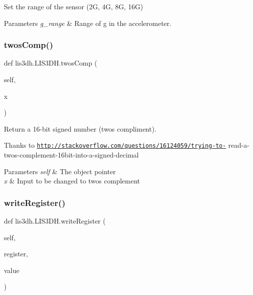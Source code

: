 Set the range of the sensor (2G, 4G, 8G, 16G) 


\begin{DoxyParams}{Parameters}
{\em g\+\_\+range} & Range of g in the accelerometer. \\
\hline
\end{DoxyParams}
\mbox{\label{classlis3dh_1_1_l_i_s3_d_h_a50ef59d0e77fae235ed31f2f6e6ae57c}} 
\subsubsection{\texorpdfstring{twos\+Comp()}{twosComp()}}
{\footnotesize\ttfamily def lis3dh.\+L\+I\+S3\+D\+H.\+twos\+Comp (\begin{DoxyParamCaption}\item[{}]{self,  }\item[{}]{x }\end{DoxyParamCaption})}



Return a 16-\/bit signed number (two\textquotesingle{}s compliment). 

Thanks to \href{http://stackoverflow.com/questions/16124059/trying-to-}{\tt http\+://stackoverflow.\+com/questions/16124059/trying-\/to-\/} read-\/a-\/twos-\/complement-\/16bit-\/into-\/a-\/signed-\/decimal 
\begin{DoxyParams}{Parameters}
{\em self} & The object pointer \\
\hline
{\em x} & Input to be changed to two\textquotesingle{}s complement \\
\hline
\end{DoxyParams}
\mbox{\label{classlis3dh_1_1_l_i_s3_d_h_ad240efbeee72b620399ba8ae8016bcd5}} 
\subsubsection{\texorpdfstring{write\+Register()}{writeRegister()}}
{\footnotesize\ttfamily def lis3dh.\+L\+I\+S3\+D\+H.\+write\+Register (\begin{DoxyParamCaption}\item[{}]{self,  }\item[{}]{register,  }\item[{}]{value }\end{DoxyParamCaption})}



